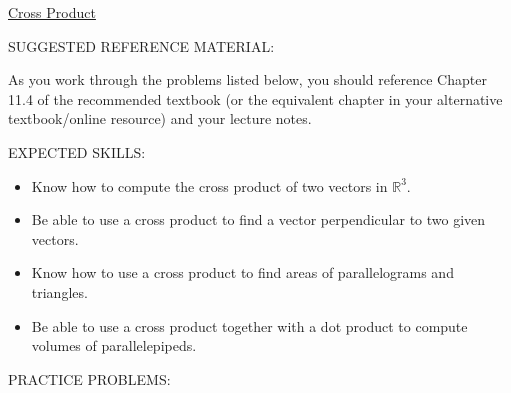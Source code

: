 \documentclass[12pt]{article}
\begin{document}
\begin{center}
\underline{\LARGE{Cross Product}}
\end{center}

\noindent SUGGESTED REFERENCE MATERIAL:

\bigskip

\noindent As you work through the problems listed below, you should reference Chapter 11.4 of the recommended textbook (or the equivalent chapter in your alternative textbook/online resource) and your lecture notes.

\bigskip

\noindent EXPECTED SKILLS:

\begin{itemize}

\item Know how to compute the cross product of two vectors in $\mathbb{R}^3$. 

\item Be able to use a cross product to find a vector perpendicular to two given vectors.

\item Know how to use a cross product to find areas of parallelograms and triangles.

\item Be able to use a cross product together with a dot product to compute volumes of parallelepipeds.

\end{itemize}

\noindent PRACTICE PROBLEMS:

\medskip
\end{document}
